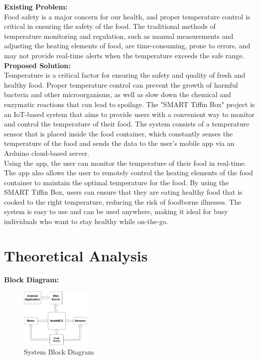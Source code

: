 \documentclass[conference]{IEEEtran}
\begin{document}
\textbf{Existing Problem:\\} Food safety is a major concern for our health, and proper temperature control is critical in ensuring the safety of the food. The traditional methods of temperature monitoring and regulation, such as manual measurements and adjusting the heating elements of food, are time-consuming, prone to errors, and may not provide real-time alerts when the temperature exceeds the safe range. \\
\textbf{Proposed Solution:\\}Temperature is a critical factor for ensuring the safety and quality of fresh and healthy food. Proper temperature control can prevent the growth of harmful bacteria and other microorganisms, as well as slow down the chemical and enzymatic reactions that can lead to spoilage.
The "SMART Tiffin Box" project is an IoT-based system that aims to provide users with a convenient way to monitor and control the temperature of their food. The system consists of a temperature sensor that is placed inside the food container, which constantly senses the temperature of the food and sends the data to the user's mobile app via an Arduino cloud-based server.\\
Using the app, the user can monitor the temperature of their food in real-time. The app also allows the user to remotely control the heating elements of the food container to maintain the optimal temperature for the food.
By using the SMART Tiffin Box, users can ensure that they are eating healthy food that is cooked to the right temperature, reducing the risk of foodborne illnesses. The system is easy to use and can be used anywhere, making it ideal for busy individuals who want to stay healthy while on-the-go.


\section{Theoretical Analysis}
\textbf{Block Diagram:\\}

\begin{figure}[htbp]
\centerline{\includegraphics[width=0.3\textwidth]{blockdiagram.drawio.png}}
\caption{System Block Diagram}
\label{fig}
\end{figure}
\end{document}
